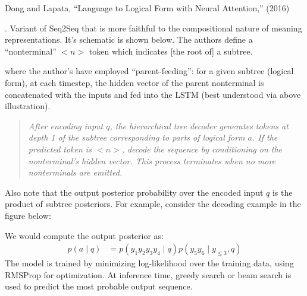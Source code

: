 \documentclass[11pt]{article}
\begin{document}


\vspace{-1em}
{\footnotesize Dong and Lapata, ``Language to Logical Form with Neural Attention,'' (2016)}

\p {}. Variant of Seq2Seq that is more faithful to the compositional nature of meaning representations. It's schematic is shown below. The authors define a ``nonterminal'' $<n>$ token which indicates [the root of] a subtree.


where the author's have employed ``parent-feeding'': for a given subtree (logical form), at each timestep, the hidden vector of the parent nonterminal is concatenated with the inputs and fed into the LSTM (best understood via above illustration). 

\begin{quote}
	{\itshape After encoding input $q$, the hierarchical tree decoder generates tokens at depth 1 of the subtree corresponding to parts of logical form $a$. If the predicted token is $<n>$, decode the sequence by conditioning on the nonterminal's hidden vector. This process terminates when no more nonterminals are emitted. }
\end{quote}

Also note that the output posterior probability over the encoded input $q$ is the product of subtree posteriors. For example, consider the decoding example in the figure below:

We would compute the output posterior as:
\begin{align}
p(a \mid q) &= p(y_1 y_2 y_3 y_4 \mid q) p(y_5 y_6 \mid y_{\le 3},q)
\end{align}
The model is trained by minimizing log-likelihood over the training data, using RMSProp for optimization. At inference time, greedy search or beam search is used to predict the most probable output sequence.








\end{document}
